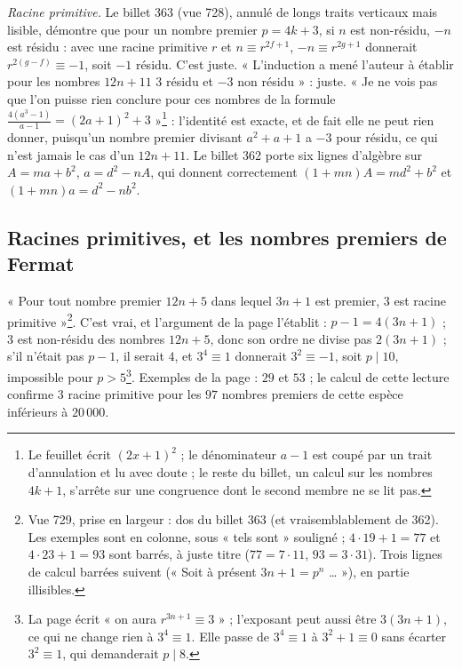 \documentclass[11pt,a4paper]{article}
\begin{document}
\emph{Racine primitive.} Le billet 363 (vue 728), annulé de longs traits verticaux mais lisible, démontre que pour un nombre premier $p=4k+3$, si $n$ est non-résidu, $-n$ est résidu : avec une racine primitive $r$ et $n\equiv r^{2f+1}$, $-n\equiv r^{2g+1}$ donnerait $r^{2(g-f)}\equiv -1$, soit $-1$ résidu. C'est juste. « L'induction a mené l'auteur à établir pour les nombres $12n+11$ $3$ résidu et $-3$ non résidu » : juste. « Je ne vois pas que l'on puisse rien conclure pour ces nombres de la formule $\frac{4(a^3-1)}{a-1}=(2a+1)^2+3$ »\footnote{Le feuillet écrit $(2x+1)^2$ ; le dénominateur $a-1$ est coupé par un trait d'annulation et lu avec doute ; le reste du billet, un calcul sur les nombres $4k+1$, s'arrête sur une congruence dont le second membre ne se lit pas.} : l'identité est exacte, et de fait elle ne peut rien donner, puisqu'un nombre premier divisant $a^2+a+1$ a $-3$ pour résidu, ce qui n'est jamais le cas d'un $12n+11$. Le billet 362 porte six lignes d'algèbre sur $A=ma+b^2$, $a=d^2-nA$, qui donnent correctement $(1+mn)A=md^2+b^2$ et $(1+mn)a=d^2-nb^2$.

\subsection*{Racines primitives, et les nombres premiers de Fermat}

« Pour tout nombre premier $12n+5$ dans lequel $3n+1$ est premier, $3$ est racine primitive »\footnote{Vue 729, prise en largeur : dos du billet 363 (et vraisemblablement de 362). Les exemples sont en colonne, sous « tels sont » souligné ; $4\cdot19+1=77$ et $4\cdot23+1=93$ sont barrés, à juste titre ($77=7\cdot11$, $93=3\cdot31$). Trois lignes de calcul barrées suivent (« Soit à présent $3n+1=p^n$ … »), en partie illisibles.}. C'est vrai, et l'argument de la page l'établit : $p-1=4(3n+1)$ ; $3$ est non-résidu des nombres $12n+5$, donc son ordre ne divise pas $2(3n+1)$ ; s'il n'était pas $p-1$, il serait $4$, et $3^4\equiv 1$ donnerait $3^2\equiv-1$, soit $p\mid 10$, impossible pour $p>5$\footnote{La page écrit « on aura $r^{3n+1}\equiv 3$ » ; l'exposant peut aussi être $3(3n+1)$, ce qui ne change rien à $3^4\equiv1$. Elle passe de $3^4\equiv1$ à $3^2+1\equiv0$ sans écarter $3^2\equiv 1$, qui demanderait $p\mid 8$.}. Exemples de la page : $29$ et $53$ ; le calcul de cette lecture confirme $3$ racine primitive pour les $97$ nombres premiers de cette espèce inférieurs à $20\,000$.
\end{document}
